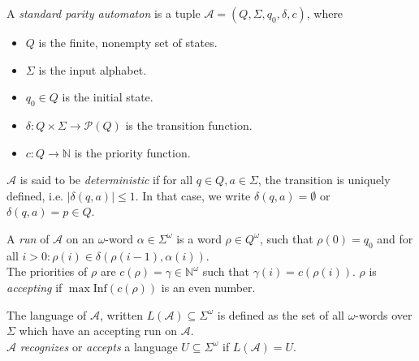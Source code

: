 \begin{defn}
	A \emph{standard parity automaton} is a tuple $\mathcal{A} = (Q, \Sigma, q_0, \delta, c)$, where
	\begin{itemize}
		\item $Q$ is the finite, nonempty set of states.
		\item $\Sigma$ is the input alphabet.
		\item $q_0 \in Q$ is the initial state.
		\item $\delta : Q \times \Sigma \rightarrow \mathcal{P}(Q)$ is the transition function.
		\item $c : Q \rightarrow \mathbb{N}$ is the priority function.
	\end{itemize}
	$\mathcal{A}$ is said to be \emph{deterministic} if for all $q \in Q, a \in \Sigma$, the transition is uniquely defined, i.e. $|\delta(q, a)| \leq 1$. In that case, we write $\delta(q, a) = \emptyset$ or $\delta(q, a) = p \in Q$.
	
	A \emph{run} of $\mathcal{A}$ on an $\omega$-word $\alpha \in \Sigma^\omega$ is a word $\rho \in Q^\omega$, such that $\rho(0) = q_0$ and for all $i > 0: \rho(i) \in \delta(\rho(i-1), \alpha(i))$. \\
	The priorities of $\rho$ are $c(\rho) = \gamma \in \mathbb{N}^\omega$ such that $\gamma(i) = c(\rho(i))$. $\rho$ is \emph{accepting} if $\max \text{Inf}(c(\rho))$ is an even number.
	
	The language of $\mathcal{A}$, written $L(\mathcal{A}) \subseteq \Sigma^\omega$ is defined as the set of all $\omega$-words over $\Sigma$ which have an accepting run on $\mathcal{A}$. \\
	$\mathcal{A}$ \emph{recognizes} or \emph{accepts} a language $U \subseteq \Sigma^\omega$ if $L(\mathcal{A}) = U$.
\end{defn}


